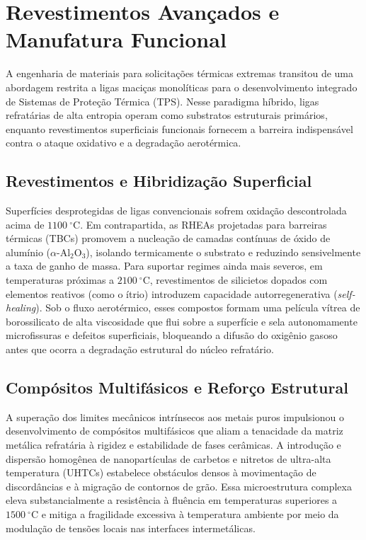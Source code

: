 \section{Revestimentos Avançados e Manufatura Funcional}\label{sec:revestimentos_manufatura_funcional}

A engenharia de materiais para solicitações térmicas extremas transitou de uma abordagem restrita a ligas maciças monolíticas para o desenvolvimento integrado de Sistemas de Proteção Térmica (TPS). Nesse paradigma híbrido, ligas refratárias de alta entropia operam como substratos estruturais primários, enquanto revestimentos superficiais funcionais fornecem a barreira indispensável contra o ataque oxidativo e a degradação aerotérmica.

\subsection{Revestimentos e Hibridização Superficial}\label{subsec:revestimentos_hibridizacao}

Superfícies desprotegidas de ligas convencionais sofrem oxidação descontrolada acima de $1100~^\circ\mathrm{C}$. Em contrapartida, as RHEAs projetadas para barreiras térmicas (TBCs) promovem a nucleação de camadas contínuas de óxido de alumínio ($\alpha\text{-Al}_2\text{O}_3$), isolando termicamente o substrato e reduzindo sensivelmente a taxa de ganho de massa. Para suportar regimes ainda mais severos, em temperaturas próximas a $2100~^\circ\mathrm{C}$, revestimentos de silicietos dopados com elementos reativos (como o ítrio) introduzem capacidade autorregenerativa (\emph{self-healing}). Sob o fluxo aerotérmico, esses compostos formam uma película vítrea de borossilicato de alta viscosidade que flui sobre a superfície e sela autonomamente microfissuras e defeitos superficiais, bloqueando a difusão do oxigênio gasoso antes que ocorra a degradação estrutural do núcleo refratário.

\subsection{Compósitos Multifásicos e Reforço Estrutural}\label{subsec:compositos_multifasicos}

A superação dos limites mecânicos intrínsecos aos metais puros impulsionou o desenvolvimento de compósitos multifásicos que aliam a tenacidade da matriz metálica refratária à rigidez e estabilidade de fases cerâmicas. A introdução e dispersão homogênea de nanopartículas de carbetos e nitretos de ultra-alta temperatura (UHTCs) estabelece obstáculos densos à movimentação de discordâncias e à migração de contornos de grão. Essa microestrutura complexa eleva substancialmente a resistência à fluência em temperaturas superiores a $1500~^\circ\mathrm{C}$ e mitiga a fragilidade excessiva à temperatura ambiente por meio da modulação de tensões locais nas interfaces intermetálicas.

